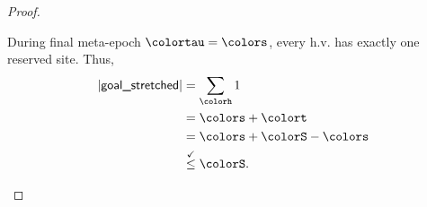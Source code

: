 \begin{proof}
\begin{proofpart}[Case $\colortau=\colors$]
During final meta-epoch $\colortau=\colors$, every h.v. has exactly one reserved site.
Thus,
\begin{align*}
|\textsf{goal\_stretched}|
&=
\sum_{\colorh} 1\\
&= \colors + \colort\\
&= \colors + \colorS - \colors\\
&\stackrel{\checkmark}{\leq} \colorS.
\end{align*}
\end{proofpart}







\end{proof}
